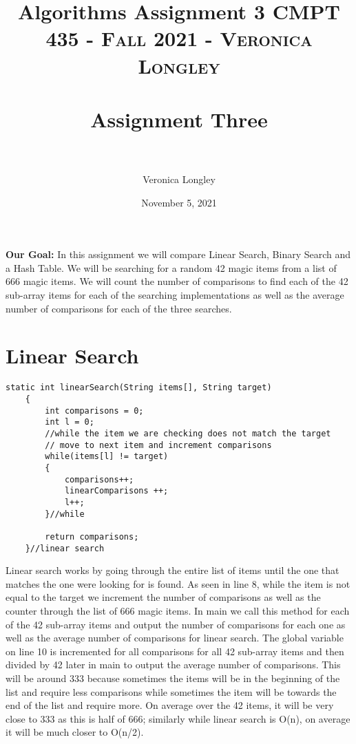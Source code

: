 \documentclass{article}
\title{\textbf{Algorithms Assignment 3}}
\author{Veronica Longley }
\date{November 5, 2021}
\title{	
   \normalfont \normalsize 
   \textsc{CMPT 435 - Fall 2021 - Veronica Longley} \\[10pt] %
   \horrule{0.5pt} \\[0.25cm] 	%
   \huge Assignment Three    	    \\ %
   \horrule{0.5pt} \\[0.25cm] 	%
}
\begin{document}
\lstset{numbers= left}
\lstset{language=Java}
\huge
\newcommand{\horrule}[1]{\rule{\linewidth}{#1}}

\maketitle{}


\pagebreak
\large
\textbf{Our Goal:}
In this assignment we will compare Linear Search, Binary Search and a Hash Table. We will be searching for a random 42 magic items from a list of 666 magic items. We will count the number of comparisons to find each of the 42 sub-array items for each of the searching implementations as well as the average number of comparisons for each of the three searches. 

\small
\section{Linear Search}
\begin{lstlisting}[frame =single,
backgroundcolor = \color{grey!12}]
	static int linearSearch(String items[], String target)
	{
		int comparisons = 0; 
		int l = 0;
		//while the item we are checking does not match the target
		// move to next item and increment comparisons 
		while(items[l] != target)
		{
			comparisons++;
			linearComparisons ++;
			l++;
		}//while
				
		return comparisons;
	}//linear search
\end{lstlisting}
\large
Linear search works by going through the entire list of items until the one that matches the one were looking for is found. As seen in line 8, while the item is not equal to the target we increment the number of comparisons as well as the counter through the list of 666 magic items. In main we call this method for each of the 42 sub-array items and output the number of comparisons for each one as well as the average number of comparisons for linear search. The global variable on line 10 is incremented for all comparisons for all 42 sub-array items and then divided by 42 later in main to output the average number of comparisons. This will be around 333 because sometimes the items will be in the beginning of the list and require less comparisons while sometimes the item will be towards the end of the list and require more. On average over the 42 items, it will be very close to 333 as this is half of 666; similarly while linear search is O(n), on average it will be much closer to O(n/2). 

\small
\end{document}
